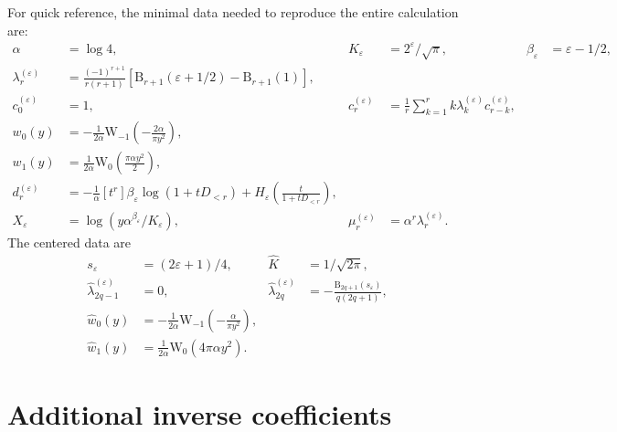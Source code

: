 \documentclass[11pt,a4paper]{article}
\theoremstyle{clean}
\theoremstyle{definition}
\newcommand{\eps}{\varepsilon}
\newcommand{\al}{\alpha}
\newcommand{\be}{\beta}
\newcommand{\B}{\mathrm B}
\newcommand{\W}{\mathrm W}
\newcommand{\Coeff}[2]{\left[#1\right]#2}
\begin{document}
For quick reference, the minimal data needed to reproduce the entire calculation are:
\begin{align*}
 \al&=\log4,& K_\eps&=2^\eps/\sqrt\pi,& \be_\eps&=\eps-1/2,\\
 \lambda_r^{(\eps)}
 &=\frac{(-1)^{r+1}}{r(r+1)}
 \left[\B_{r+1}(\eps+1/2)-\B_{r+1}(1)\right],&&&\\
 c_0^{(\eps)}&=1,&
 c_r^{(\eps)}&=\frac1r\sum_{k=1}^rk\lambda_k^{(\eps)}c_{r-k}^{(\eps)},&&\\
 w_0(y)&=-\frac1{2\al}\W_{-1}\!\left(-\frac{2\al}{\pi y^2}\right),&&\\
 w_1(y)&=\frac1{2\al}\W_0\!\left(\frac{\pi\al y^2}{2}\right),&&\\
 d_r^{(\eps)}&=-\frac1\al\Coeff{t^r}{
 \be_\eps\log(1+tD_{<r})+
 H_\eps\!\left(\frac{t}{1+tD_{<r}}\right)},&&&\\
 X_\eps&=\log\!\left(y\al^{\be_\eps}/K_\eps\right),&
 \mu_r^{(\eps)}&=\al^r\lambda_r^{(\eps)}.&&
\end{align*}
The centered data are
\begin{align*}
 s_\eps&=(2\eps+1)/4,&
 \widehat K&=1/\sqrt{2\pi},\\
 \widehat\lambda_{2q-1}^{(\eps)}&=0,&
 \widehat\lambda_{2q}^{(\eps)}&=-\frac{\B_{2q+1}(s_\eps)}{q(2q+1)},\\
 \widehat w_0(y)&=-\frac1{2\al}\W_{-1}\!\left(-\frac\al{\pi y^2}\right),&&\\
 \widehat w_1(y)&=\frac1{2\al}\W_0\!\left(4\pi\al y^2\right).&&
\end{align*}

\section{Additional inverse coefficients}
\label{app:more-d}
\end{document}

